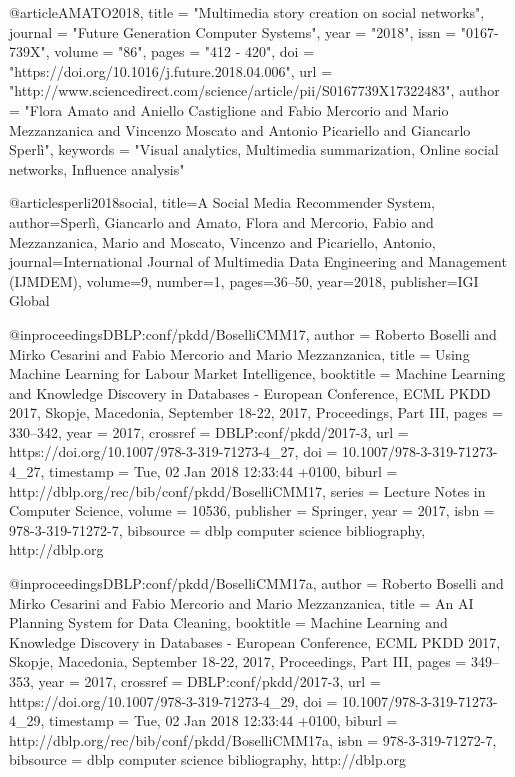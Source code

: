 {{@article{AMATO2018,
title = "Multimedia story creation on social networks",
journal = "Future Generation Computer Systems",
year = "2018",
issn = "0167-739X",
volume = "86",
pages = "412 - 420",
doi = "https://doi.org/10.1016/j.future.2018.04.006",
url = "http://www.sciencedirect.com/science/article/pii/S0167739X17322483",
author = "Flora Amato and Aniello Castiglione and Fabio Mercorio and Mario Mezzanzanica and Vincenzo Moscato and Antonio Picariello and Giancarlo Sperlì",
keywords = "Visual analytics, Multimedia summarization, Online social networks, Influence analysis"
}

@article{sperli2018social,
  title={A Social Media Recommender System},
  author={Sperlì, Giancarlo and Amato, Flora and Mercorio, Fabio and Mezzanzanica, Mario and Moscato, Vincenzo and Picariello, Antonio},
  journal={International Journal of Multimedia Data Engineering and Management (IJMDEM)},
  volume={9},
  number={1},
  pages={36--50},
  year={2018},
  publisher={IGI Global}
}



@inproceedings{DBLP:conf/pkdd/BoselliCMM17,
  author    = {Roberto Boselli and
               Mirko Cesarini and
               Fabio Mercorio and
               Mario Mezzanzanica},
  title     = {Using Machine Learning for Labour Market Intelligence},
  booktitle = {Machine Learning and Knowledge Discovery in Databases - European Conference,
               {ECML} {PKDD} 2017, Skopje, Macedonia, September 18-22, 2017, Proceedings,
               Part {III}},
  pages     = {330--342},
  year      = {2017},
  crossref  = {DBLP:conf/pkdd/2017-3},
  url       = {https://doi.org/10.1007/978-3-319-71273-4_27},
  doi       = {10.1007/978-3-319-71273-4_27},
  timestamp = {Tue, 02 Jan 2018 12:33:44 +0100},
  biburl    = {http://dblp.org/rec/bib/conf/pkdd/BoselliCMM17},
series    = {Lecture Notes in Computer Science},
  volume    = {10536},
  publisher = {Springer},
  year      = {2017},
  isbn      = {978-3-319-71272-7},
  bibsource = {dblp computer science bibliography, http://dblp.org}
}

@inproceedings{DBLP:conf/pkdd/BoselliCMM17a,
  author    = {Roberto Boselli and
               Mirko Cesarini and
               Fabio Mercorio and
               Mario Mezzanzanica},
  title     = {An {AI} Planning System for Data Cleaning},
  booktitle = {Machine Learning and Knowledge Discovery in Databases - European Conference,
               {ECML} {PKDD} 2017, Skopje, Macedonia, September 18-22, 2017, Proceedings,
               Part {III}},
  pages     = {349--353},
  year      = {2017},
  crossref  = {DBLP:conf/pkdd/2017-3},
  url       = {https://doi.org/10.1007/978-3-319-71273-4_29},
  doi       = {10.1007/978-3-319-71273-4_29},
  timestamp = {Tue, 02 Jan 2018 12:33:44 +0100},
  biburl    = {http://dblp.org/rec/bib/conf/pkdd/BoselliCMM17a},
  isbn      = {978-3-319-71272-7},
  bibsource = {dblp computer science bibliography, http://dblp.org}
}

}}
